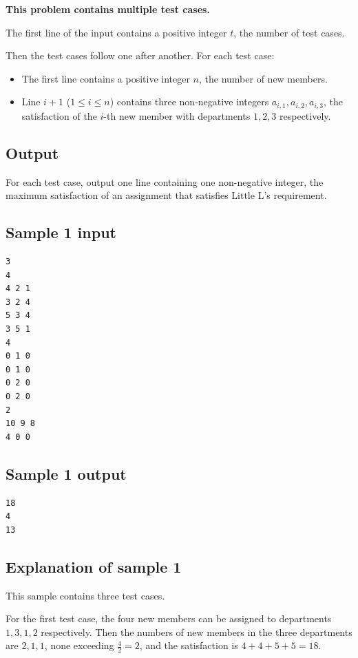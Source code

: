 \documentclass[11pt]{article}
\begin{document}
\textbf{This problem contains multiple test cases.}

The first line of the input contains a positive integer $t$, the number of
test cases.

Then the test cases follow one after another.
For each test case:
\begin{itemize}
\item The first line contains a positive integer $n$, the number of new
  members.
\item Line $i+1$ ($1 \le i \le n$) contains three non-negative integers
  $a_{i,1}, a_{i,2}, a_{i,3}$, the satisfaction of the $i$-th new member
  with departments $1, 2, 3$ respectively.
\end{itemize}

\subsection*{Output}

For each test case, output one line containing one non-negative integer,
the maximum satisfaction of an assignment that satisfies Little L's
requirement.

\subsection*{Sample 1 input}

\begin{verbatim}
3
4
4 2 1
3 2 4
5 3 4
3 5 1
4
0 1 0
0 1 0
0 2 0
0 2 0
2
10 9 8
4 0 0
\end{verbatim}

\subsection*{Sample 1 output}

\begin{verbatim}
18
4
13
\end{verbatim}

\subsection*{Explanation of sample 1}

This sample contains three test cases.

For the first test case, the four new members can be assigned to
departments $1, 3, 1, 2$ respectively.
Then the numbers of new members in the three departments are $2, 1, 1$,
none exceeding $\frac{4}{2} = 2$, and the satisfaction is
$4 + 4 + 5 + 5 = 18$.
\end{document}
